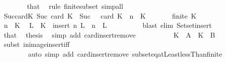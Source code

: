 \begin{isabellebody}
\ \ \ \ \ \ \isamarkupfalse%
\ that\ \isamarkupfalse%
\ {\isacharparenleft}{\kern0pt}rule\ finite{\isacharunderscore}{\kern0pt}subset{\isacharparenright}{\kern0pt}\ simp{\isacharunderscore}{\kern0pt}all\isanewline
\ \ \ \ \isamarkupfalse%
\ Suc{\isacharunderscore}{\kern0pt}card{\isacharunderscore}{\kern0pt}K{\isacharcolon}{\kern0pt}\ {\isachardoublequoteopen}Suc\ {\isacharparenleft}{\kern0pt}card\ K\ {\isacharminus}{\kern0pt}\ Suc\ {}{\isacharparenright}{\kern0pt}\ {\isacharequal}{\kern0pt}\ card\ K{\isachardoublequoteclose}\ \ {\isachardoublequoteopen}n\ {\isasymin}\ K{\isachardoublequoteclose}\isanewline
\ \ \ \ \ \ \ {\isachardoublequoteopen}finite\ K{\isachardoublequoteclose}\isanewline
\ \ \ \ \isamarkupfalse%
\ {\isacharminus}{\kern0pt}\isanewline
\ \ \ \ \ \ \isamarkupfalse%
\ {\isacartoucheopen}n\ {\isasymin}\ K{\isacartoucheclose}\ \isamarkupfalse%
\ L\ \ {\isachardoublequoteopen}K\ {\isacharequal}{\kern0pt}\ insert\ n\ L{\isachardoublequoteclose}\ \ {\isachardoublequoteopen}n\ {\isasymnotin}\ L{\isachardoublequoteclose}\isanewline
\ \ \ \ \ \ \ \ \isamarkupfalse%
\ {\isacharparenleft}{\kern0pt}blast\ elim{\isacharcolon}{\kern0pt}\ Set{\isachardot}{\kern0pt}set{\isacharunderscore}{\kern0pt}insert{\isacharparenright}{\kern0pt}\isanewline
\ \ \ \ \ \ \isamarkupfalse%
\ that\ \isamarkupfalse%
\ {\isacharquery}{\kern0pt}thesis\ \isamarkupfalse%
\ {\isacharparenleft}{\kern0pt}simp\ add{\isacharcolon}{\kern0pt}\ card{\isachardot}{\kern0pt}insert{\isacharunderscore}{\kern0pt}remove{\isacharparenright}{\kern0pt}\isanewline
\ \ \ \ \isamarkupfalse%
\isanewline
\ \ \ \ \isamarkupfalse%
\ {\isachardoublequoteopen}K\ {\isasymin}\ {\isacharquery}{\kern0pt}A\ {\isasymlongleftrightarrow}\ K\ {\isasymin}\ {\isacharquery}{\kern0pt}B{\isachardoublequoteclose}\isanewline
\ \ \ \ \ \ \isamarkupfalse%
\ {\isacharparenleft}{\kern0pt}subst\ in{\isacharunderscore}{\kern0pt}image{\isacharunderscore}{\kern0pt}insert{\isacharunderscore}{\kern0pt}iff{\isacharparenright}{\kern0pt}\isanewline
\ \ \ \ \ \ \ \ {\isacharparenleft}{\kern0pt}auto\ simp\ add{\isacharcolon}{\kern0pt}\ card{\isachardot}{\kern0pt}insert{\isacharunderscore}{\kern0pt}remove\ subset{\isacharunderscore}{\kern0pt}eq{\isacharunderscore}{\kern0pt}atLeast{}{\isacharunderscore}{\kern0pt}lessThan{\isacharunderscore}{\kern0pt}finite\isanewline

\end{isabellebody}
